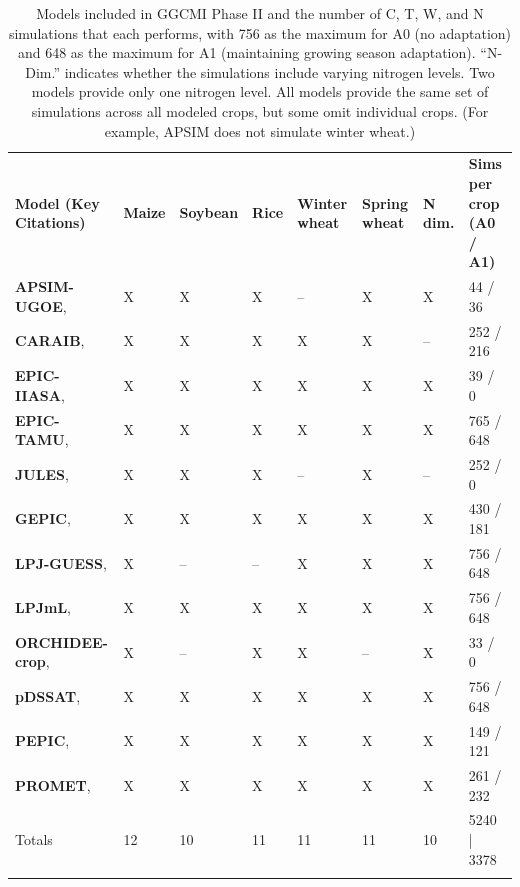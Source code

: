 \documentclass[gmd, manuscript]{copernicus} %
\begin{document}
{\begin{table}[t]
\caption{Models included in GGCMI Phase II and the number of C, T, W, and N simulations that each performs, with 756 as the maximum for A0 (no adaptation) and 648 as the maximum for A1 (maintaining growing season adaptation). 
``N-Dim.'' indicates whether the simulations include varying nitrogen levels. Two models provide only one nitrogen level. 
All models provide the same set of simulations across all modeled crops, but some omit individual crops. (For example, APSIM does not simulate winter wheat.)}
\label{table:models}
	\begin{tabular}{p{6cm} p{1cm} p{1cm} p{1cm} p{1cm} p{1cm} p{1cm} p{1.9cm}}
        \tophline
		{\textbf{Model (Key Citations)}}&{\textbf{Maize}}&{\textbf{Soybean}}&{\textbf{Rice}}&{\textbf{Winter wheat}}&{\textbf{Spring wheat}}&{\textbf{N dim.}}&{\textbf{Sims per crop (A0 / A1)}}\\ \middlehline
        {\textbf{APSIM-UGOE},   \citet{KEATING2003267, HOLZWORTH2014327}} & {X} & {X} & {X} & {--} & {X} & {X} & {44 / 36}\\ \middlehline
        {\textbf{CARAIB},       \citet{Dury2011, Pirttioja2015}} & {X} & {X} & {X} & {X} & {X} & {--} & {252 / 216}\\ \middlehline
        {\textbf{EPIC-IIASA},   \citet{BALKOVIC2014}} & {X} & {X} & {X} & {X} & {X} & {X} & {39 / 0}\\  \middlehline
        {\textbf{EPIC-TAMU},    \citet{Izaurralde06}} & {X} & {X} & {X} & {X} & {X} & {X} & {765 / 648}\\ \middlehline
        {\textbf{JULES},        \citet{Osborne2015, Williams2015, Williams2017}} & {X} & {X} & {X} & {--} & {X} & {--} & {252 / 0}\\ \middlehline
        {\textbf{GEPIC},        \citet{LIU2007478, FOLBERTH201221}} & {X} & {X} & {X} & {X} & {X} & {X} & {430 / 181}\\ \middlehline
        {\textbf{LPJ-GUESS},    \citet{Lindeskog2013, Olin2015}} & {X} & {--} & {--} & {X} & {X} & {X} & {756 / 648}\\  \middlehline
        {\textbf{LPJmL},        \citet{von_Bloh_implementing_2018}} & {X} & {X} & {X} & {X} & {X} & {X} & {756 / 648}\\ \middlehline
        {\textbf{ORCHIDEE-crop},\citet{Wu2016}} & {X} & {--} & {X} & {X} & {--} & {X} & {33 / 0}\\ \middlehline
        {\textbf{pDSSAT},       \citet{Elliott2014b, JONES2003235}} & {X} & {X} & {X} & {X} & {X} & {X} & {756 / 648}\\ \middlehline
        {\textbf{PEPIC},        \citet{LIU2016164, LIU2016}} & {X} & {X} & {X} & {X} & {X} & {X} & {149 / 121}\\ \middlehline
        {\textbf{PROMET},       \citet{Hank2015, MAUSER2015}} & {X} & {X} & {X} & {X} & {X} & {X} & {261 / 232}\\ \middlehline
        {Totals} & {12} & {10} & {11} & {11} & {11} & {10} & {5240 | 3378}\\
        \bottomhline
    \end{tabular}
\end{table}

}
\end{document}
